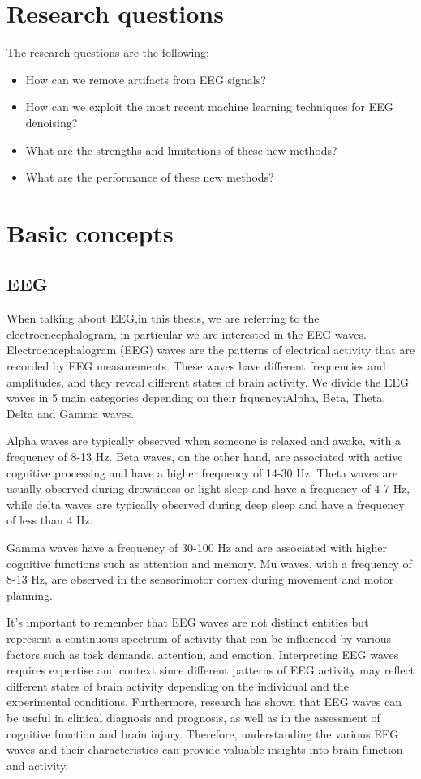 \documentclass[a4paper]{sapthesis}
\begin{document}
\section{Research questions}
The research questions are the following:
\begin{itemize}
\item How can we remove artifacts from EEG signals?
\item How can we exploit the most recent machine learning techniques for
    EEG denoising?
\item What are the strengths and limitations of these new methods?
\item What are the performance of these new methods?
\end{itemize}
\section{Basic concepts}
\subsection{EEG}
When talking about EEG,in this thesis, we are referring to the
 electroencephalogram, in particular we are interested in the 
 EEG waves. Electroencephalogram (EEG) waves are the patterns 
 of electrical activity that are recorded by EEG measurements. 
 These waves have different frequencies and amplitudes, and they 
 reveal different states of brain activity. We divide the EEG waves in 
 5 main categories depending on their frquency:Alpha, Beta, Theta, 
 Delta and Gamma waves.


 Alpha waves are typically observed when someone is relaxed and awake,
  with a frequency of 8-13 Hz. Beta waves, on the other hand, are 
  associated with active cognitive processing and have a higher frequency 
  of 14-30 Hz. Theta waves are usually observed during drowsiness or
   light sleep and have a frequency of 4-7 Hz, while delta waves are
    typically observed during deep sleep and have a frequency of less 
    than 4 Hz.
 
 Gamma waves have a frequency of 30-100 Hz and are associated with higher 
 cognitive functions such as attention and memory. Mu waves, with a 
 frequency of 8-13 Hz, are observed in the sensorimotor cortex during 
 movement and motor planning.
 
 It's important to remember that EEG waves are not distinct entities but 
 represent a continuous spectrum of activity that can be influenced by
  various factors such as task demands, attention, and emotion. Interpreting EEG waves requires expertise 
  and context since different patterns of EEG activity may reflect 
  different states of brain activity depending on the individual and the 
  experimental conditions. Furthermore, research has shown that EEG waves
   can be useful in clinical diagnosis and prognosis, as well as in the
    assessment of cognitive function and brain injury. Therefore, 
    understanding the various EEG waves and their characteristics 
    can provide valuable insights into brain function and activity.
\end{document}
